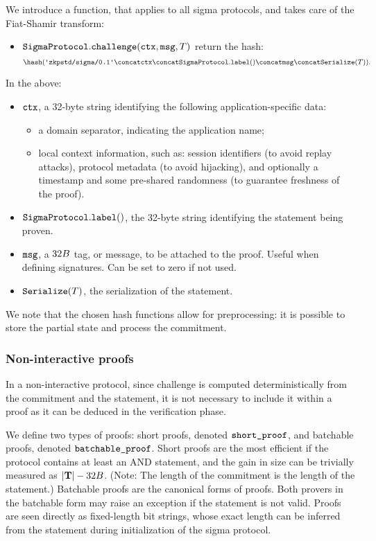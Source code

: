 \documentclass[11pt]{article}
\begin{document}
We introduce a function, that applies to all sigma protocols, and takes care of the Fiat-Shamir transform:
\begin{itemize}
  \item $\texttt{SigmaProtocol}.\texttt{challenge}(\texttt{ctx}, \texttt{msg}, T)$
  return the hash:\[
    \hash(\domsepctx \concat \ctx \concat \sigmaprotocol.\labeltt() \concat \msg \concat  \serialize(\commitment)).
    \]
\end{itemize}
In the above:
\begin{itemize}[label=$-$]
  \item $\texttt{ctx}$, a 32-byte string identifying the following application-specific data:
  \begin{itemize}
    \item a domain separator, indicating the application name;
    \item local context information, such as:
    session identifiers (to avoid replay attacks), protocol metadata (to avoid hijacking), and optionally a timestamp and some pre-shared randomness (to guarantee freshness of the proof).
  \end{itemize}
  \item $\texttt{SigmaProtocol}.\texttt{label}()$, the 32-byte string identifying the statement being proven.
  \item $\texttt{msg}$, a $32B$ tag, or message, to be attached to the proof.
  Useful when defining signatures. Can be set to zero if not used.
  \item $\texttt{Serialize}(T)$, the serialization of the statement.
\end{itemize}

We note that the chosen hash functions allow for preprocessing: it is possible to store the partial state and process the commitment.


\subsubsection{Non-interactive proofs}

In a non-interactive protocol, since challenge is computed deterministically from the commitment and the statement, it is not necessary to include it within a proof as it can be deduced in the verification phase.

We define two types of proofs: short proofs, denoted $\texttt{short\_proof}$, and batchable proofs, denoted $\texttt{batchable\_proof}$.
Short proofs are the most efficient if the protocol contains at least an AND statement, and the gain in size can be trivially measured as $|\mathbf {T}| - 32B$.
(Note: The length of the commitment is the length of the statement.)
Batchable proofs are the canonical forms of proofs.
Both provers in the batchable form may raise an exception if the statement is not valid.
Proofs are seen directly as fixed-length bit strings, whose exact length can be inferred from the statement during initialization of the sigma protocol.
\end{document}
